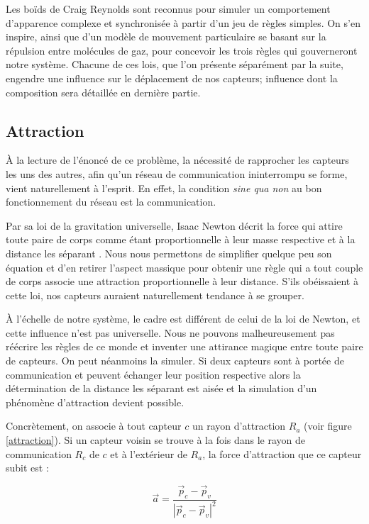 \documentclass[10pt]{article}
\begin{document}
\begin{multicols}{2}
Les boïds de Craig Reynolds \cite{Reynolds1987} sont reconnus pour
simuler un comportement d'apparence complexe et synchronisée à partir
d'un jeu de règles simples. On s'en inspire, ainsi que d'un modèle de
mouvement particulaire \cite{Cheng2011497} se basant sur la répulsion
entre molécules de gaz, pour concevoir les trois règles qui
gouverneront notre système. Chacune de ces lois, que l'on présente
séparément par la suite, engendre une influence sur le déplacement de
nos capteurs; influence dont la composition sera détaillée en dernière
partie.

\subsection*{Attraction}

\`A la lecture de l'énoncé de ce problème, la nécessité de rapprocher
les capteurs les uns des autres, afin qu'un réseau de communication
ininterrompu se forme, vient naturellement à l'esprit. En effet, la
condition \textit{sine qua non} au bon fonctionnement du réseau est la
communication.

Par sa loi de la gravitation universelle, Isaac Newton décrit la force
qui attire toute paire de corps comme étant proportionnelle à leur
masse respective et à la distance les séparant \cite{newton}. Nous
nous permettons de simplifier quelque peu son équation et d'en retirer
l'aspect massique pour obtenir une règle qui a tout couple de corps
associe une attraction proportionnelle à leur distance. S'ils
obéissaient à cette loi, nos capteurs auraient naturellement tendance
à se grouper.

\`A l'échelle de notre système, le cadre est différent de celui de la
loi de Newton, et cette influence n'est pas universelle. Nous ne
pouvons malheureusement pas réécrire les règles de ce monde et
inventer une attirance magique entre toute paire de capteurs. On peut
néanmoins la simuler. Si deux capteurs sont à portée de communication
et peuvent échanger leur position respective alors la détermination de
la distance les séparant est aisée et la simulation d'un phénomène
d'attraction devient possible.

Concrètement, on associe à tout capteur $c$ un rayon d'attraction
$R_a$ (voir figure \ref{attraction}). Si un capteur voisin se trouve à
la fois dans le rayon de communication $R_c$ de $c$ et à l'extérieur
de $R_a$, la force d'attraction que ce capteur subit est :

$$
\vec{a} = \frac{\vec{p}_c - \vec{p}_v}{|\vec{p}_c - \vec{p}_v|^2}
$$


\end{multicols}
\end{document}
